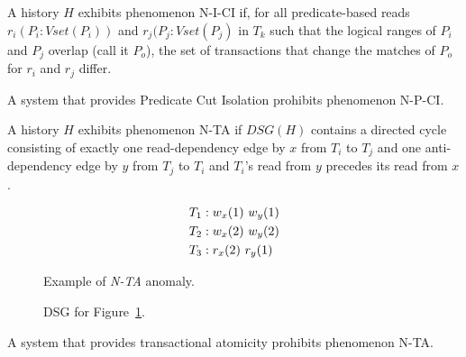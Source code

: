 \begin{definition}
A history $H$ exhibits phenomenon N-I-CI if, for all predicate-based
reads $r_i(P_i:Vset(P_i))$ and $r_j(P_j:Vset(P_j)$ in $T_k$ such that
the logical ranges of $P_i$ and $P_j$ overlap (call it $P_o$), the set
of transactions that change the matches of $P_o$ for $r_i$ and $r_j$
differ.
\end{definition}

\begin{definition}
A system that provides Predicate Cut Isolation prohibits phenomenon N-P-CI.
\end{definition}

\begin{definition}
A history $H$ exhibits phenomenon N-TA if $DSG(H)$ contains a directed cycle
consisting of exactly one read-dependency edge by $x$ from $T_i$ to
$T_j$ and one anti-dependency edge by $y$ from $T_j$ to $T_i$ and
$T_i$'s read from $y$ precedes its read from $x$.
\end{definition}


\begin{figure}[H]
\begin{align*}
\small
T_1 &: w_x(1)~w_y(1)\\
T_2 &: w_x(2)~w_y(2)\\
T_3 &: r_x(2)~r_y(1)
\end{align*}
\caption{Example of \textit{N-TA} anomaly.}
\label{fig:nta-history}
\end{figure}

\begin{figure}[H]
\centering
{}
\caption{DSG for Figure~\ref{fig:nta-history}.}
\label{fig:nta-dsg}
\end{figure}

\begin{definition}
A system that provides transactional atomicity prohibits phenomenon
N-TA.
\end{definition}

